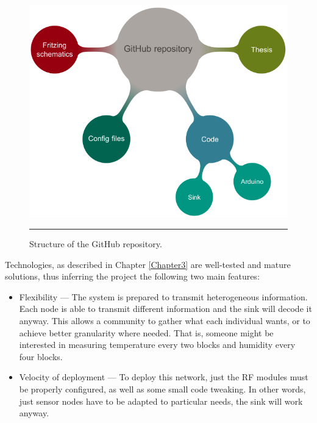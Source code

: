 \begin{figure}[htbp]
    \centering
        \includegraphics[width=\linewidth]{./Figures/github_repo.png}
        \rule{35em}{0.5pt}
        \caption[Structure of the GitHub repository]{Structure of the GitHub repository.}
    \label{fig:repo}
\end{figure}

Technologies, as described in Chapter \ref{Chapter3} are well-tested and mature solutions, thus inferring the project the following two main features:

\begin{itemize}
    \item Flexibility --- The system is prepared to transmit heterogeneous information. Each node is able to transmit different information and the sink will decode it anyway. This allows a community to gather what each individual wants, or to achieve better granularity where needed. That is, someone might be interested in measuring temperature every two blocks and humidity every four blocks.
    \item Velocity of deployment --- To deploy this network, just the RF modules must be properly configured, as well as some small code tweaking. In other words, just sensor nodes have to be adapted to particular needs, the sink will work anyway.
\end{itemize}



